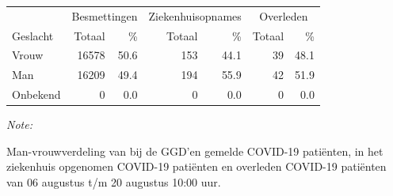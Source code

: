 \documentclass[
  english,
  man,floatsintext]{apa6}
\begin{document}
\begin{table}
\centering\begingroup\fontsize{11}{13}\selectfont

\begin{threeparttable}
\begin{tabular}{lrrrrrr}
\toprule
\multicolumn{1}{c}{ } & \multicolumn{2}{c}{Besmettingen} & \multicolumn{2}{c}{Ziekenhuisopnames} & \multicolumn{2}{c}{Overleden} \\
\cmidrule(l{3pt}r{3pt}){2-3} \cmidrule(l{3pt}r{3pt}){4-5} \cmidrule(l{3pt}r{3pt}){6-7}
Geslacht & Totaal & \% & Totaal & \% & Totaal & \%\\
\midrule
Vrouw & 16578 & 50.6 & 153 & 44.1 & 39 & 48.1\\
Man & 16209 & 49.4 & 194 & 55.9 & 42 & 51.9\\
Onbekend & 0 & 0.0 & 0 & 0.0 & 0 & 0.0\\
\bottomrule
\end{tabular}
\begin{tablenotes}
\item \textit{Note: } 
\item Man-vrouwverdeling van bij de GGD’en gemelde COVID-19 patiënten, in het ziekenhuis opgenomen COVID-19 patiënten en overleden COVID-19 patiënten van 06 augustus t/m 20 augustus 10:00 uur.
\end{tablenotes}
\end{threeparttable}
\endgroup{}
\end{table}
\newpage
\end{document}
